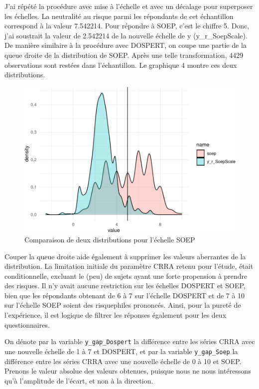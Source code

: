 \documentclass[12pt]{article}
\begin{document}
J'ai répété la procédure avec mise à l'échelle et avec un décalage pour
superposer les échelles. La neutralité au risque parmi les répondants de
cet échantillon correspond à la valeur 7.542214. Pour répondre à SOEP,
c'est le chiffre 5. Donc, j'ai soustrait la valeur de 2.542214 de la
nouvelle échelle de y (y\_r\_SoepScale). De manière similaire à la
procédure avec DOSPERT, on coupe une partie de la queue droite de la
distribution de SOEP. Après une telle transformation, 4429 observations
sont restées dans l'échantillon. Le graphique 4 montre ces deux
distributions.

\begin{figure}
\centering
\includegraphics{Report-de-stage_PC_files/figure-latex/distsoep-1}
\caption{Comparaison de deux distributions pour l'échelle SOEP}
\end{figure}

Couper la queue droite aide également à supprimer les valeurs aberrantes
de la distribution. La limitation initiale du paramètre CRRA retenu pour
l'étude, était conditionnelle, excluant le (peu) de sujets ayant une
forte propension à prendre des risques. Il n'y avait aucune restriction
sur les échelles DOSPERT et SOEP, bien que les répondants obtenant de 6
à 7 sur l'échelle DOSPERT et de 7 à 10 sur l'échelle SOEP soient des
risquephiles prononcés. Ainsi, pour la pureté de l'expérience, il est
logique de filtrer les réponses également pour les deux questionnaires.

On dénote par la variable \texttt{y\_gap\_Dospert} la différence entre
les séries CRRA avec une nouvelle échelle de 1 à 7 et DOSPERT, et par la
variable \texttt{y\_gap\_Soep} la différence entre les séries CRRA avec
une nouvelle échelle de 0 à 10 et SOEP. Prenons le valeur absolue des
valeurs obtenues, puisque nous ne nous intéressons qu'à l'amplitude de
l'écart, et non à la direction.
\end{document}
